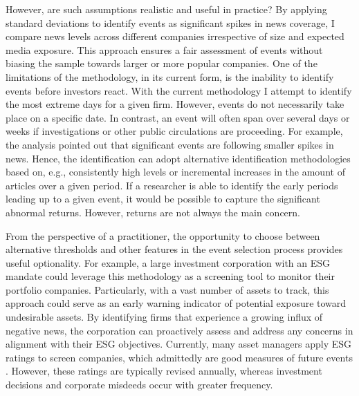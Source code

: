 However, are such assumptions realistic and useful in practice? By applying standard deviations to identify events as significant spikes in news coverage, I compare news levels across different companies irrespective of size and expected media exposure. This approach ensures a fair assessment of events without biasing the sample towards larger or more popular companies. One of the limitations of the methodology, in its current form, is the inability to identify events before investors react. With the current methodology I attempt to identify the most extreme days for a given firm. However, events do not necessarily take place on a specific date. In contrast, an event will often span over several days or weeks if investigations or other public circulations are proceeding. For example, the analysis pointed out that significant events are following smaller spikes in news. Hence, the identification can adopt alternative identification methodologies based on, e.g., consistently high levels or incremental increases in the amount of articles over a given period. If a researcher is able to identify the early periods leading up to a given event, it would be possible to capture the significant abnormal returns. However, returns are not always the main concern. 

From the perspective of a practitioner, the opportunity to choose between alternative thresholds and other features in the event selection process provides useful optionality. For example, a large investment corporation with an ESG mandate could leverage this methodology as a screening tool to monitor their portfolio companies. Particularly, with a vast number of assets to track, this approach could serve as an early warning indicator of potential exposure toward undesirable assets. By identifying firms that experience a growing influx of negative news, the corporation can proactively assess and address any concerns in alignment with their ESG objectives. Currently, many asset managers apply ESG ratings to screen companies, which admittedly are good measures of future events \citep{serafeim2022stock}. However, these ratings are typically revised annually, whereas investment decisions and corporate misdeeds occur with greater frequency. 

